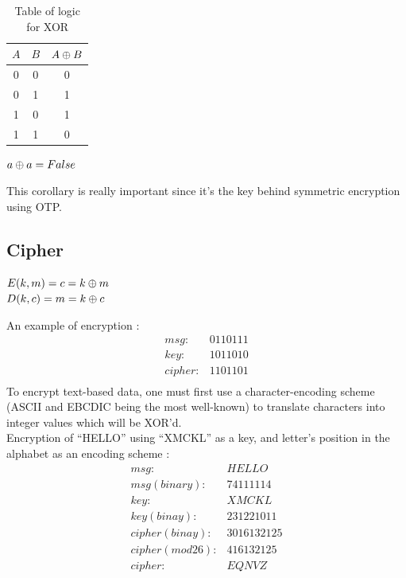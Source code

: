 \begin{table}[ht!]
	\centering
		\begin{tabular}{c|c|c}
			$A$ & $B$ & $A\oplus B$ \\
			\hline
			0 & 0 & 0 \\
			0 & 1 & 1 \\
			1 & 0 & 1 \\
			1 & 1 & 0 \\
			\hline 
		\end{tabular}
	\caption{Table of logic for XOR}
	\label{tab:TableOfLogicForXOR}
\end{table}

\begin{mytheorem}
    $ a \oplus a = False $
\end{mytheorem}
This corollary is really important since it's the key behind symmetric encryption using OTP.

\subsection{Cipher}

\begin{mydef}
\begin{minipage}[t]{0.8\textwidth}
	$ E(k,m) = c = k \oplus m $ \\
	$ D(k,c ) = m = k \oplus c$
\end{minipage}
\end{mydef}

An example of encryption :
\begin{align*}
    msg: & 0 1 1 0 1 1 1      \\
    key: & 1 0 1 1 0 1 0      \\
    cipher: & 1 1 0 1 1 0 1  \\
\end{align*}
To encrypt text-based data, one must first use a character-encoding scheme (ASCII and  EBCDIC being the most well-known) to translate characters into integer values which will be XOR'd. \\

Encryption of ``HELLO'' using ``XMCKL'' as a key, and letter's position in the alphabet as an encoding scheme :
\begin{align*}
    msg: & H E L L O        \\
    msg (binary) : & 7 4 11 11 14 \\
    key: & X M C K L   \\
    key (binay) :& 23 12 2 10 11 \\
    cipher (binay): & 30 16 13 21 25  \\
    cipher (mod 26) : & 4 16 13 21 25 \\
    cipher :& E Q N V Z  \\
\end{align*}

